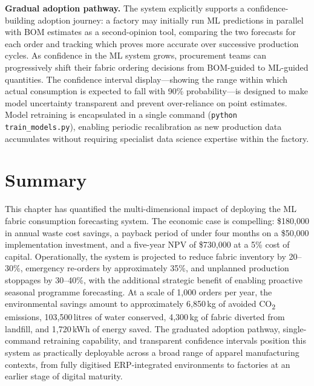 \textbf{Gradual adoption pathway.} The system explicitly supports a confidence-building adoption journey: a factory may initially run ML predictions in parallel with BOM estimates as a second-opinion tool, comparing the two forecasts for each order and tracking which proves more accurate over successive production cycles. As confidence in the ML system grows, procurement teams can progressively shift their fabric ordering decisions from BOM-guided to ML-guided quantities. The confidence interval display---showing the range within which actual consumption is expected to fall with 90\% probability---is designed to make model uncertainty transparent and prevent over-reliance on point estimates. Model retraining is encapsulated in a single command (\texttt{python train\_models.py}), enabling periodic recalibration as new production data accumulates without requiring specialist data science expertise within the factory.

\secdiv
\section{Summary}
This chapter has quantified the multi-dimensional impact of deploying the ML fabric consumption forecasting system. The economic case is compelling: \$180{,}000 in annual waste cost savings, a payback period of under four months on a \$50{,}000 implementation investment, and a five-year NPV of \$730{,}000 at a 5\% cost of capital. Operationally, the system is projected to reduce fabric inventory by 20--30\%, emergency re-orders by approximately 35\%, and unplanned production stoppages by 30--40\%, with the additional strategic benefit of enabling proactive seasonal programme forecasting. At a scale of 1{,}000 orders per year, the environmental savings amount to approximately 6{,}850\,kg of avoided CO\textsubscript{2} emissions, 103{,}500\,litres of water conserved, 4{,}300\,kg of fabric diverted from landfill, and 1{,}720\,kWh of energy saved. The graduated adoption pathway, single-command retraining capability, and transparent confidence intervals position this system as practically deployable across a broad range of apparel manufacturing contexts, from fully digitised ERP-integrated environments to factories at an earlier stage of digital maturity.

